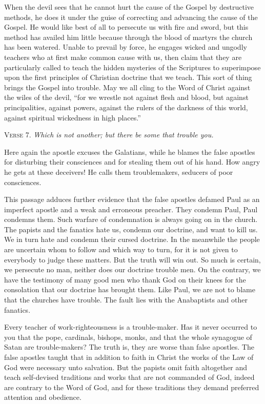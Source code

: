When the devil sees that he cannot hurt the cause of the Gospel by destructive methods, he does it under the guise of correcting and advancing the cause of the Gospel. He would like best of all to persecute us with fire and sword, but this method has availed him little because through the blood of martyrs the church has been watered. Unable to prevail by force, he engages wicked and ungodly teachers who at first make common cause with us, then claim that they are particularly called to teach the hidden mysteries of the Scriptures to superimpose upon the first principles of Christian doctrine that we teach. This sort of thing brings the Gospel into trouble. May we all cling to the Word of Christ against the wiles of the devil, “for we wrestle not against flesh and blood, but against principalities, against powers, against the rulers of the darkness of this world, against spiritual wickedness in high places.”

\textsc{Verse} 7. \emph{Which is not another; but there be some that trouble you.}

Here again the apostle excuses the Galatians, while he blames the false apostles for disturbing their consciences and for stealing them out of his hand. How angry he gets at these deceivers! He calls them troublemakers, seducers of poor consciences.

This passage adduces further evidence that the false apostles defamed Paul as an imperfect apostle and a weak and erroneous preacher. They condemn Paul, Paul condemns them. Such warfare of condemnation is always going on in the church. The papists and the fanatics hate us, condemn our doctrine, and want to kill us. We in turn hate and condemn their cursed doctrine. In the meanwhile the people are uncertain whom to follow and which way to turn, for it is not given to everybody to judge these matters. But the truth will win out. So much is certain, we persecute no man, neither does our doctrine trouble men. On the contrary, we have the testimony of many good men who thank God on their knees for the consolation that our doctrine has brought them. Like Paul, we are not to blame that the churches have trouble. The fault lies with the Anabaptists and other fanatics.

Every teacher of work-righteousness is a trouble-maker. Has it never occurred to you that the pope, cardinals, bishops, monks, and that the whole synagogue of Satan are trouble-makers? The truth is, they are worse than false apostles. The false apostles taught that in addition to faith in Christ the works of the Law of God were necessary unto salvation. But the papists omit faith altogether and teach self-devised traditions and works that are not commanded of God, indeed are contrary to the Word of God, and for these traditions they demand preferred attention and obedience.

